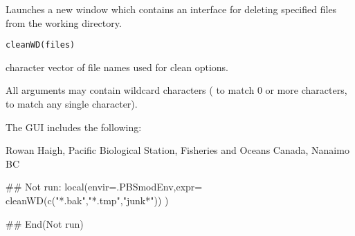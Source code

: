 \documentclass[letterpaper]{book}
\begin{document}
%
\begin{Description}\relax
Launches a new window which contains an interface for deleting 
specified files from the working directory.
\end{Description}
%
\begin{Usage}
\begin{verbatim}
cleanWD(files)
\end{verbatim}
\end{Usage}
%
\begin{Arguments}
\begin{ldescription}
\item[\code{files}] character vector of file names used for clean options.
\end{ldescription}
\end{Arguments}
%
\begin{Details}\relax
All arguments may contain wildcard characters ( to match 0 or
more characters,  to match any single character).

The GUI includes the following:

\end{Details}
%
\begin{Author}\relax
Rowan Haigh, Pacific Biological Station, Fisheries and Oceans Canada, Nanaimo BC
\end{Author}
%
\begin{Examples}
\begin{ExampleCode}
## Not run: 
local(envir=.PBSmodEnv,expr={
  cleanWD(c("*.bak","*.tmp","junk*"))
})

## End(Not run)
\end{ExampleCode}
\end{Examples}
\end{document}
